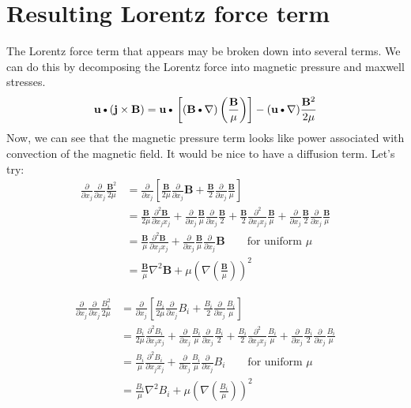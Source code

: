 \documentclass[11pt]{article}
\newcommand{\B}{\mathbf{B}}
\newcommand{\PD}{\partial}
\newcommand{\BM}{\frac{\mathbf{B}}{\mu}}
\newcommand{\J}{\mathbf{j}}
\newcommand{\U}{\mathbf{u}}
\newcommand{\DOT}{\text{\textbullet}}
\begin{document}
\section{Resulting Lorentz force term}
The Lorentz force term that appears may be broken down into several terms. We can do this by decomposing the Lorentz force into magnetic pressure and maxwell stresses.
\begin{equation}
	\U \DOT (\J \times \B) = 
	\U \DOT \left[(\B \DOT \nabla) \left( \BM \right) \right] 
	- (\U \DOT \nabla) \frac{\B^2}{2\mu}
\end{equation}
Now, we can see that the magnetic pressure term looks like power associated with convection of the magnetic field. It would be nice to have a diffusion term. Let's try:
\begin{align}
	\frac{\PD}{\PD x_j} \frac{\PD}{\PD x_j} \frac{\B^2}{2 \mu}
	& =
	\frac{\PD}{\PD x_j} 
	\left[
	\frac{\B}{2\mu} \frac{\PD}{\PD x_j} \B +  
	\frac{\B}{2} \frac{\PD}{\PD x_j} \BM
	\right] \\
	& =
	\frac{\B}{2\mu} \frac{\PD^2 \B}{\PD x_jx_j} + 
	\frac{\PD}{\PD x_j} \BM \frac{\PD}{\PD x_j} \frac{\B}{2} + 
	\frac{\B}{2} \frac{\PD^2 }{\PD x_jx_j} \BM + 
	\frac{\PD}{\PD x_j} \frac{\B}{2} \frac{\PD}{\PD x_j} \BM \\
	& =
	\frac{\B}{\mu} \frac{\PD^2 \B}{\PD x_jx_j} + 
	\frac{\PD}{\PD x_j} \BM \frac{\PD}{\PD x_j} \B \qquad \text{for uniform $\mu$} \\
	& = \BM \nabla^2 \B + \mu \left(\nabla \left( \BM \right) \right)^2
\end{align}

\begin{align}
	\frac{\PD}{\PD x_j} \frac{\PD}{\PD x_j} \frac{B_i^2}{2 \mu}
	& =
	\frac{\PD}{\PD x_j} 
	\left[
	\frac{B_i}{2\mu} \frac{\PD}{\PD x_j} B_i +  
	\frac{B_i}{2} \frac{\PD}{\PD x_j} \frac{B_i}{\mu}
	\right] \\
	& =
	\frac{B_i}{2\mu} \frac{\PD^2 B_i}{\PD x_jx_j} + 
	\frac{\PD}{\PD x_j} \frac{B_i}{\mu} \frac{\PD}{\PD x_j} \frac{B_i}{2} + 
	\frac{B_i}{2} \frac{\PD^2 }{\PD x_jx_j} \frac{B_i}{\mu} + 
	\frac{\PD}{\PD x_j} \frac{B_i}{2} \frac{\PD}{\PD x_j} \frac{B_i}{\mu} \\
	& =
	\frac{B_i}{\mu} \frac{\PD^2 B_i}{\PD x_jx_j} + 
	\frac{\PD}{\PD x_j} \frac{B_i}{\mu} \frac{\PD}{\PD x_j} B_i \qquad \text{for uniform $\mu$} \\
	& = \frac{B_i}{\mu} \nabla^2 B_i + \mu \left(\nabla \left( \frac{B_i}{\mu} \right) \right)^2
\end{align}
\end{document}
